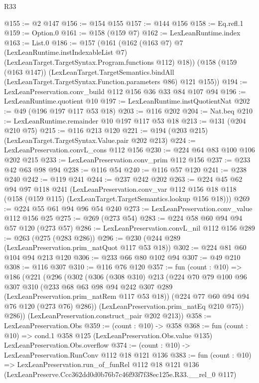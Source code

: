 \begin{lexlean}{R33}
\begin{coremodule}
@155 := @2 @147
@156 := @154 @155
@157 := @144 @156
@158 := Eq.refl.{1}
@159 := Option.{0}
@161 := @158 (@159 @7)
@162 := LexLeanRuntime.index
@163 := List.{0}
@186 := @157
    (@161
      (@162
        (@163 @7)
        @7
        (LexLeanRuntime.instIndexableList @7)
        (LexLeanTarget.TargetSyntax.Program.functions @112)
        @18))
    (@158
      (@159 (@163 @147))
      (LexLeanTarget.TargetSemantics.bindAll
        (LexLeanTarget.TargetSyntax.Function.parameters @86)
        @121
        @155))
@194 := LexLeanPreservation.conv_build @112 @156 @36 @33 @84 @107 @94
@196 := LexLeanRuntime.quotient @10
@197 := LexLeanRuntime.instQuotientNat
@202 := @49 (@196 @197 @117 @53 @18)
@203 := @116 @202
@204 := Nat.beq
@210 := LexLeanRuntime.remainder @10 @197 @117 @53 @18
@213 := @131 (@204 @210 @75)
@215 := @116 @213 @120
@221 := @194 (@203 @215) (LexLeanTarget.TargetSyntax.Value.pair @202 @213)
@224 := LexLeanPreservation.convL_cons @112 @156
@230 := @224 @64 @83 @100 @106 @202 @215
@233 := LexLeanPreservation.conv_prim @112 @156
@237 := @233 @42 @63 @98 @94
@238 := @116 @54
@240 := @116 @57 @120
@241 := @238 @240
@242 := @119 @241
@244 := @237 @242 @202
@263 := @224
    @45
    @62
    @94
    @97
    @118
    @241
    (LexLeanPreservation.conv_var
      @112
      @156
      @18
      @118
      (@158 (@159 @115) (LexLeanTarget.TargetSemantics.lookup @156 @18)))
@269 := @224 @55 @61 @94 @96 @54 @240
@273 := LexLeanPreservation.conv_value @112 @156 @25
@275 := @269 (@273 @54)
@283 := @224 @58 @60 @94 @94 @57 @120 (@273 @57)
@286 := LexLeanPreservation.convL_nil @112 @156
@289 := @263 (@275 (@283 @286))
@296 := @230 (@244 @289 (LexLeanPreservation.prim_natQuot @117 @53 @18))
@302 := @224 @81 @60 @104 @94 @213 @120
@306 := @233 @66 @80 @102 @94
@307 := @49 @210
@308 := @116 @307
@310 := @116 @76 @120
@357 := fun (count : @10) =>
  @186
    (@221
      (@296
        (@302
          (@306
            (@308 @310)
            @213
            (@224
              @70
              @79
              @100
              @96
              @307
              @310
              (@233 @68 @63 @98 @94 @242 @307 @289 (LexLeanPreservation.prim_natRem @117 @53 @18))
              (@224 @77 @60 @94 @94 @76 @120 (@273 @76) @286))
            (LexLeanPreservation.prim_natEq @210 @75))
          @286))
      (LexLeanPreservation.construct_pair @202 @213))
@358 := LexLeanPreservation.Obs
@359 := (count : @10) -> @358
@368 := fun (count : @10) =>
  cond.{1} @358 @125 (LexLeanPreservation.Obs.value @135) LexLeanPreservation.Obs.overflow
@374 := (count : @10) -> LexLeanPreservation.RunConv @112 @18 @121 @136
@383 := fun (count : @10) =>
  LexLeanPreservation.run_of_funRel
    @112
    @18
    @121
    @136
    (LexLeanPreserve.Ccc362dd0d0b76b7c46f93f7f38ec125e.R33.__rel_0 @117)
\end{coremodule}
\end{lexlean}
